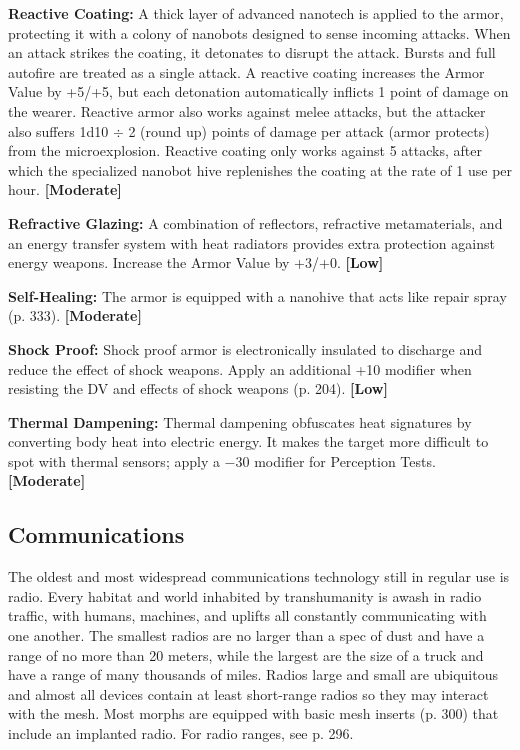 \textbf{Reactive Coating:} A thick layer of advanced nanotech is applied to the armor, protecting it with a colony of nanobots designed to sense incoming attacks. When an attack strikes the coating, it detonates to disrupt the attack. Bursts and full autofire are treated as a single attack. A reactive coating increases the Armor Value by +5/+5, but each detonation automatically inflicts 1 point of damage on the wearer. Reactive armor also works against melee attacks, but the attacker also suffers 1d10 $\div$ 2 (round up) points of damage per attack (armor protects) from the microexplosion. Reactive coating only works against 5 attacks, after which the specialized nanobot hive replenishes the coating at the rate of 1 use per hour. \textbf{[Moderate]}

\textbf{Refractive Glazing:} A combination of reflectors, refractive metamaterials, and an energy transfer system with heat radiators provides extra protection against energy weapons. Increase the Armor Value by +3/+0. \textbf{[Low]}

\textbf{Self-Healing:} The armor is equipped with a nanohive that acts like repair spray (p. 333). \textbf{[Moderate]}

\textbf{Shock Proof:} Shock proof armor is electronically insulated to discharge and reduce the effect of shock weapons. Apply an additional +10 modifier when resisting the DV and effects of shock weapons (p. 204). \textbf{[Low]}

\textbf{Thermal Dampening:} Thermal dampening obfuscates heat signatures by converting body heat into electric energy. It makes the target more difficult to spot with thermal sensors; apply a $-$30 modifier for Perception Tests. \textbf{[Moderate]}

\subsection{Communications}
\label{sec:communications}

The oldest and most widespread communications technology still in regular use is radio. Every habitat and world inhabited by transhumanity is awash in radio traffic, with humans, machines, and uplifts all constantly communicating with one another. The smallest radios are no larger than a spec of dust and have a range of no more than 20 meters, while the largest are the size of a truck and have a range of many thousands of miles. Radios large and small are ubiquitous and almost all devices contain at least short-range radios so they may interact with the mesh. Most morphs are equipped with basic mesh inserts (p. 300) that include an implanted radio. For radio ranges, see p. 296.

